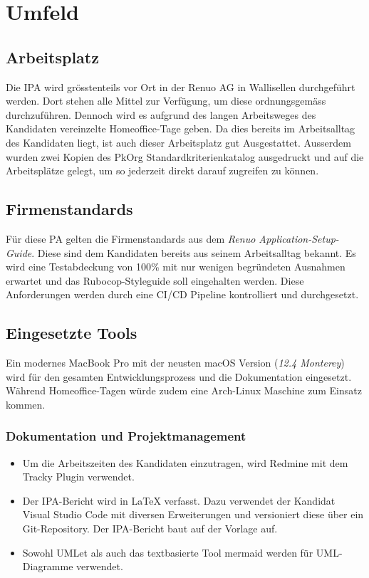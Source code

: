\chapter{Umfeld} \label{ch:environment}

\section{Arbeitsplatz}

Die IPA wird grösstenteils vor Ort in der Renuo AG in Wallisellen durchgeführt werden.
Dort stehen alle Mittel zur Verfügung, um diese ordnungsgemäss durchzuführen.
Dennoch wird es aufgrund des langen Arbeitsweges des Kandidaten vereinzelte Homeoffice-Tage geben. Da dies
bereits im Arbeitsalltag des Kandidaten liegt, ist auch dieser Arbeitsplatz gut Ausgestattet.
Ausserdem wurden zwei Kopien des PkOrg Standardkriterienkatalog ausgedruckt und auf die Arbeitsplätze gelegt,
um so jederzeit direkt darauf zugreifen zu können.

\section{Firmenstandards}

Für diese PA gelten die Firmenstandards aus dem \emph{Renuo Application-Setup-Guide}. Diese sind
dem Kandidaten bereits aus seinem Arbeitsalltag bekannt. Es wird eine Testabdeckung von 100\% mit nur wenigen begründeten Ausnahmen erwartet
und das Rubocop-Styleguide soll eingehalten werden. Diese Anforderungen werden durch eine CI/CD Pipeline kontrolliert und durchgesetzt.

\section{Eingesetzte Tools} \label{sec:tools}

Ein modernes MacBook Pro mit der neusten macOS Version (\emph{12.4 Monterey}) wird für den gesamten Entwicklungsprozess und die Dokumentation eingesetzt.
Während Homeoffice-Tagen würde zudem eine Arch-Linux Maschine zum Einsatz kommen.

\subsection{Dokumentation und Projektmanagement}

\begin{itemize}
    \item Um die Arbeitszeiten des Kandidaten einzutragen, wird Redmine mit dem Tracky Plugin verwendet.
    \item Der IPA-Bericht wird in LaTeX verfasst. Dazu verwendet der Kandidat Visual Studio Code mit diversen Erweiterungen
          und versioniert diese über ein Git-Repository. Der IPA-Bericht baut auf der Vorlage \cite{Buhler_ipa-template_2022} auf.
    \item Sowohl UMLet als auch das textbasierte Tool mermaid werden für UML-Diagramme verwendet.
\end{itemize}

